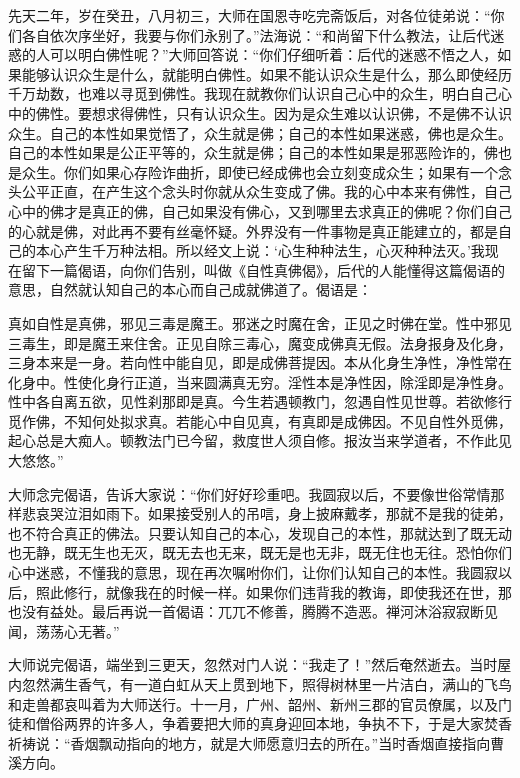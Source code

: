 \documentclass[12pt,twoside,openany]{book}
\newcommand{\kai}[1]{{\CJKfamily{kai}#1}}
\begin{document}
\kai{先天二年，岁在癸丑，八月初三，大师在国恩寺吃完斋饭后，对各位徒弟说：“你们各自依次序坐好，我要与你们永别了。”法海说：“和尚留下什么教法，让后代迷惑的人可以明白佛性呢？”大师回答说：“你们仔细听着：后代的迷惑不悟之人，如果能够认识众生是什么，就能明白佛性。如果不能认识众生是什么，那么即使经历千万劫数，也难以寻觅到佛性。我现在就教你们认识自己心中的众生，明白自己心中的佛性。要想求得佛性，只有认识众生。因为是众生难以认识佛，不是佛不认识众生。自己的本性如果觉悟了，众生就是佛；自己的本性如果迷惑，佛也是众生。自己的本性如果是公正平等的，众生就是佛；自己的本性如果是邪恶险诈的，佛也是众生。你们如果心存险诈曲折，即使已经成佛也会立刻变成众生；如果有一个念头公平正直，在产生这个念头时你就从众生变成了佛。我的心中本来有佛性，自己心中的佛才是真正的佛，自己如果没有佛心，又到哪里去求真正的佛呢？你们自己的心就是佛，对此再不要有丝毫怀疑。外界没有一件事物是真正能建立的，都是自己的本心产生千万种法相。所以经文上说：‘心生种种法生，心灭种种法灭。’我现在留下一篇偈语，向你们告别，叫做《自性真佛偈》，后代的人能懂得这篇偈语的意思，自然就认知自己的本心而自己成就佛道了。偈语是：
	
真如自性是真佛，邪见三毒是魔王。邪迷之时魔在舍，正见之时佛在堂。性中邪见三毒生，即是魔王来住舍。正见自除三毒心，魔变成佛真无假。法身报身及化身，三身本来是一身。若向性中能自见，即是成佛菩提因。本从化身生净性，净性常在化身中。性使化身行正道，当来圆满真无穷。淫性本是净性因，除淫即是净性身。性中各自离五欲，见性刹那即是真。今生若遇顿教门，忽遇自性见世尊。若欲修行觅作佛，不知何处拟求真。若能心中自见真，有真即是成佛因。不见自性外觅佛，起心总是大痴人。顿教法门已今留，救度世人须自修。报汝当来学道者，不作此见大悠悠。”

大师念完偈语，告诉大家说：“你们好好珍重吧。我圆寂以后，不要像世俗常情那样悲哀哭泣泪如雨下。如果接受别人的吊唁，身上披麻戴孝，那就不是我的徒弟，也不符合真正的佛法。只要认知自己的本心，发现自己的本性，那就达到了既无动也无静，既无生也无灭，既无去也无来，既无是也无非，既无住也无往。恐怕你们心中迷惑，不懂我的意思，现在再次嘱咐你们，让你们认知自己的本性。我圆寂以后，照此修行，就像我在的时候一样。如果你们违背我的教诲，即使我还在世，那也没有益处。最后再说一首偈语：兀兀不修善，腾腾不造恶。禅河沐浴寂寂断见闻，荡荡心无著。”

大师说完偈语，端坐到三更天，忽然对门人说：“我走了！”然后奄然逝去。当时屋内忽然满生香气，有一道白虹从天上贯到地下，照得树林里一片洁白，满山的飞鸟和走兽都哀叫着为大师送行。十一月，广州、韶州、新州三郡的官员僚属，以及门徒和僧俗两界的许多人，争着要把大师的真身迎回本地，争执不下，于是大家焚香祈祷说：“香烟飘动指向的地方，就是大师愿意归去的所在。”当时香烟直接指向曹溪方向。

}
\end{document}

